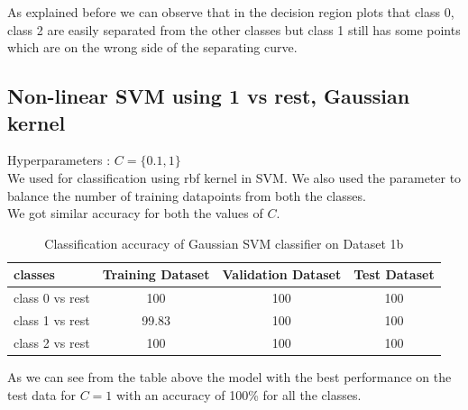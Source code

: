 \documentclass[11pt]{article}
\begin{document}
As explained before we can observe that in the decision region plots that class 0, class 2 are easily separated from the other classes but class 1 still has some points which are on the wrong side of the separating curve. 

\newpage

\subsection{Non-linear SVM using 1 vs rest, Gaussian kernel}
Hyperparameters : $C = \{0.1,1\}$\\
We used for classification using rbf kernel in SVM. We also used the parameter to balance the number of training datapoints from both the classes. \\
We got similar accuracy for both the values of $C$.
\begin{table}[h!]
\label{tab:tab2.3.1}
\begin{center}
\begin{tabular}{|l|c|c|c|}
\hline
\textbf{classes} & \textbf{Training Dataset} & \textbf{Validation Dataset} &\textbf{Test Dataset}\\
\hline
class 0 vs rest & 100 & 100 & 100\\
\hline
class 1 vs rest & 99.83 & 100 & 100\\
\hline
class 2 vs rest & 100 & 100 & 100\\
\hline
\end{tabular}
\caption{Classification accuracy of Gaussian SVM classifier on Dataset 1b}
\end{center}
\end{table}

As we can see from the table above the model with the best performance on the test data for $C=1$ with an accuracy of 100\% for all the classes. 
\end{document}
